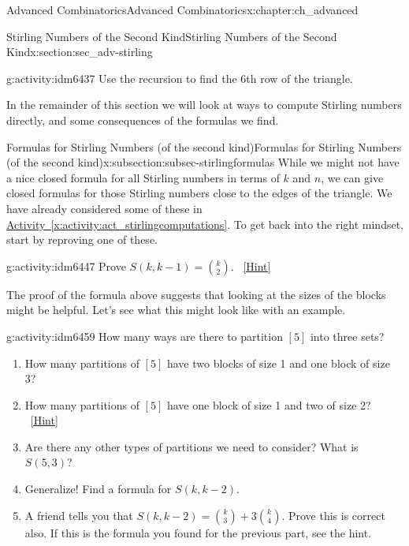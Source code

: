 \documentclass[oneside,10pt,]{book}
\numberwithin{equation}{chapter}
\begin{document}
\begin{chapterptx}{Advanced Combinatorics}{}{Advanced Combinatorics}{}{}{x:chapter:ch_advanced}
\begin{sectionptx}{Stirling Numbers of the Second Kind}{}{Stirling Numbers of the Second Kind}{}{}{x:section:sec_adv-stirling}
\begin{introduction}{}
\begin{sidebyside}{1}{0.25}{0.25}{0}
\end{sidebyside}%
\begin{activity}{}{g:activity:idm6437}%
Use the recursion to find the 6th row of the triangle.%
\end{activity}
In the remainder of this section we will look at ways to compute Stirling numbers directly, and some consequences of the formulas we find.%
\end{introduction}%
%
%
\typeout{************************************************}
\typeout{************************************************}
%
\begin{subsectionptx}{Formulas for Stirling Numbers (of the second kind)}{}{Formulas for Stirling Numbers (of the second kind)}{}{}{x:subsection:subsec-stirlingformulas}
While we might not have a nice closed formula for all Stirling numbers in terms of \(k\) and \(n\), we can give closed formulas for those Stirling numbers close to the edges of the triangle.  We have already considered some of these in \hyperref[x:activity:act_stirlingcomputations]{Activity~\ref{x:activity:act_stirlingcomputations}}.  To get back into the right mindset, start by reproving one of these.%
\begin{activity}{}{g:activity:idm6447}%
Prove \(S(k, k-1) = \binom{k}{2}\).%
\qquad~\hfill{\tiny\hyperlink{g:hint:idm6451-back}{[Hint]}}\end{activity}
The proof of the formula above suggests that looking at the sizes of the blocks might be helpful.  Let's see what this might look like with an example.%
\begin{activity}{}{g:activity:idm6459}%
How many ways are there to partition \([5]\) into three sets?%
\begin{enumerate}[font=\bfseries,label=(\alph*),ref=\alph*]
\item{}How many partitions of \([5]\) have two blocks of size 1 and one block of size 3?%
\item{}How many partitions of \([5]\) have one block of size 1 and two of size 2?%
\qquad~\hfill{\tiny\hyperlink{g:hint:idm6474-back}{[Hint]}}\item{}Are there any other types of partitions we need to consider?  What is \(S(5,3)\)?%
\item{}Generalize! Find a formula for \(S(k, k-2)\).%
\item{}A friend tells you that \(S(k,k-2) = \binom{k}{3} + 3 \binom{k}{4}\).  Prove this is correct also.  If this is the formula you found for the previous part, see the hint.%

\end{enumerate}
\end{activity}
\end{subsectionptx}
\end{sectionptx}
\end{chapterptx}
\end{document}
